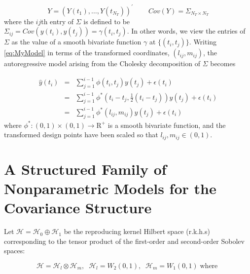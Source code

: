 \[
Y = \left(Y\left(t_1\right) , \dots, Y\left(t_{N_T} \right)\right)^\prime\;\;\;\;\;\;\;\; Cov\left(Y\right) = \Sigma_{N_T \times N_T}
\]
\noindent
where the $ij$th entry of $\Sigma$ is defined to be $\Sigma_{ij} = Cov\left(y\left(t_i\right), y\left(t_j\right)  \right) = \gamma\left(t_i,t_j\right)$. In other words, we view the entries of $\Sigma$ as the value of a smooth bivariate function $\gamma$ at $\lbrace \left(t_i,t_j\right) \rbrace$. Writing \eqref{eq:MyModel} in terms of the transformed coordinates, $\left(l_{ij}, m_{ij}\right)$, the autoregressive model arising from the Cholesky decomposition of $\Sigma$ becomes

\begin{eqnarray}   
\hat{y}\left(t_i\right)  &=& \sum_{j=1}^{i-1} \phi\left(t_i ,t_j\right) y\left({t_j}\right) + \epsilon\left({t_i}\right)\nonumber \\ 
&=& \sum_{j=1}^{i-1} \phi^*\left(t_i - t_j, \frac{1}{2}\left(t_i - t_j\right)\right) y\left({t_j}\right) + \epsilon\left({t_i}\right) \nonumber \\
&=& \sum_{j=1}^{i-1} \phi^*\left(l_{ij}, m_{ij}\right)  y\left({t_j}\right) + \epsilon\left({t_i}\right) \label{eq:MyTransformedModel}
\end{eqnarray}  
\noindent  
where $\phi^*:\left(0,1\right)\times \left(0,1\right)\rightarrow \mathrm{R}^+$ is a smooth bivariate function, and the transformed design points have been scaled so that $l_{ij},m_{ij} \in \left(0,1\right)$.

\section{A Structured Family of Nonparametric Models for the Covariance Structure}


Let $\mathcal{H} = \mathcal{H}_{0} \oplus \mathcal{H}_{1}$ be the reproducing kernel Hilbert space (r.k.h.s) corresponding to the tensor product of the first-order and second-order Sobolev spaces:

\[
\mathcal{H} = \mathcal{H}_{l} \otimes \mathcal{H}_{m}, \;\; \mathcal{H}_{l} = W_2\left(0,1\right),\;\;\mathcal{H}_{m} = W_1\left(0,1\right)\;\mbox{where }
\]


